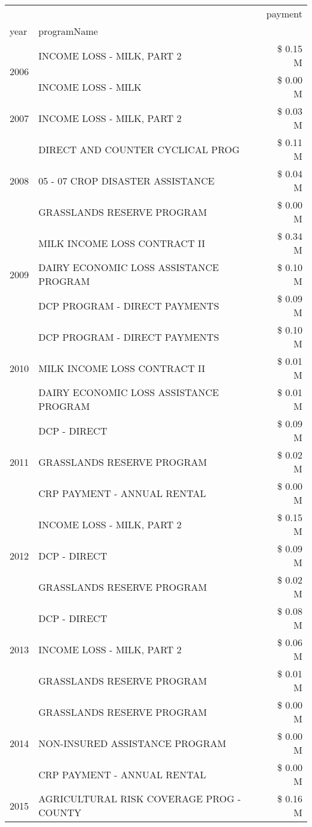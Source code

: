\begin{tabular}{llr}
\toprule
 &  & payment \\
year & programName &  \\
\midrule
\multirow[t]{2}{*}{2006} & INCOME LOSS - MILK, PART 2 & \$ 0.15 M \\
 & INCOME LOSS - MILK & \$ 0.00 M \\
\cline{1-3}
2007 & INCOME LOSS - MILK, PART 2 & \$ 0.03 M \\
\cline{1-3}
\multirow[t]{3}{*}{2008} & DIRECT AND COUNTER CYCLICAL PROG & \$ 0.11 M \\
 & 05 - 07 CROP DISASTER ASSISTANCE & \$ 0.04 M \\
 & GRASSLANDS RESERVE PROGRAM & \$ 0.00 M \\
\cline{1-3}
\multirow[t]{3}{*}{2009} & MILK INCOME LOSS CONTRACT II & \$ 0.34 M \\
 & DAIRY ECONOMIC LOSS ASSISTANCE PROGRAM & \$ 0.10 M \\
 & DCP PROGRAM - DIRECT PAYMENTS & \$ 0.09 M \\
\cline{1-3}
\multirow[t]{3}{*}{2010} & DCP PROGRAM - DIRECT PAYMENTS & \$ 0.10 M \\
 & MILK INCOME LOSS CONTRACT II & \$ 0.01 M \\
 & DAIRY ECONOMIC LOSS ASSISTANCE PROGRAM & \$ 0.01 M \\
\cline{1-3}
\multirow[t]{3}{*}{2011} & DCP - DIRECT & \$ 0.09 M \\
 & GRASSLANDS RESERVE PROGRAM & \$ 0.02 M \\
 & CRP PAYMENT - ANNUAL RENTAL & \$ 0.00 M \\
\cline{1-3}
\multirow[t]{3}{*}{2012} & INCOME LOSS - MILK, PART 2 & \$ 0.15 M \\
 & DCP - DIRECT & \$ 0.09 M \\
 & GRASSLANDS RESERVE PROGRAM & \$ 0.02 M \\
\cline{1-3}
\multirow[t]{3}{*}{2013} & DCP - DIRECT & \$ 0.08 M \\
 & INCOME LOSS - MILK, PART 2 & \$ 0.06 M \\
 & GRASSLANDS RESERVE PROGRAM & \$ 0.01 M \\
\cline{1-3}
\multirow[t]{3}{*}{2014} & GRASSLANDS RESERVE PROGRAM & \$ 0.00 M \\
 & NON-INSURED ASSISTANCE PROGRAM & \$ 0.00 M \\
 & CRP PAYMENT - ANNUAL RENTAL & \$ 0.00 M \\
\cline{1-3}
\multirow[t]{3}{*}{2015} & AGRICULTURAL RISK COVERAGE PROG - COUNTY & \$ 0.16 M \\

\end{tabular}

